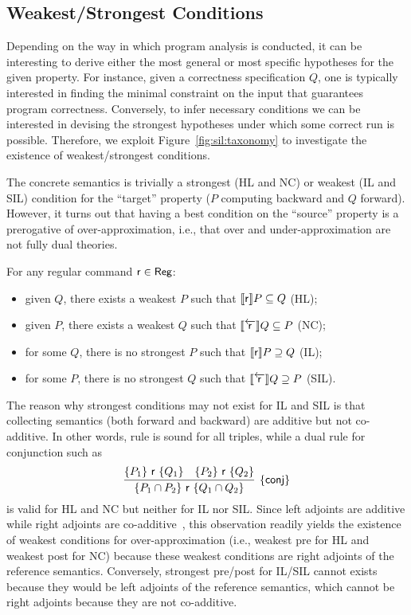\subsection{Weakest/Strongest Conditions}
Depending on the way in which program analysis is conducted, it can be interesting to derive either the most general or most specific hypotheses for the given property.
For instance, given a correctness specification $Q$, one is typically interested in finding the minimal constraint on the input that guarantees program correctness.
Conversely, to infer necessary conditions we can be interested in devising the strongest hypotheses under which some correct run is possible.
Therefore, we exploit Figure~\ref{fig:sil:taxonomy} to investigate the existence of weakest/strongest conditions.

The concrete semantics is trivially a strongest (HL and NC) or weakest (IL and SIL) condition for the ``target'' property ($P$ computing backward and $Q$ forward).
However, it turns out that having a best condition on the ``source'' property is a prerogative of over-approximation, i.e., that over and under-approximation are not fully dual theories.

\begin{prop}\label{prop:sil:best-condition-source}
	For any regular command $\mathsf{r}\in\mathsf{Reg}$:
	\begin{itemize}
		\item given $Q$, there exists a weakest $P$ such that $\llbracket\mathsf{r}\rrbracket P \subseteq Q$ (HL);
		\item given $P$, there exists a weakest $Q$ such that $\llbracket\overleftarrow{\mathsf{r}}\rrbracket Q \subseteq P$ (NC);
		\item for some $Q$, there is no strongest $P$ such that $\llbracket\mathsf{r}\rrbracket P \supseteq Q$ (IL);
		\item for some $P$, there is no strongest $Q$ such that $\llbracket\overleftarrow{\mathsf{r}}\rrbracket Q \supseteq P$ (SIL).
	\end{itemize}
\end{prop}

The reason why strongest conditions may not exist for IL and SIL is that collecting semantics (both forward and backward) are additive but not co-additive. In other words, rule  is sound for all triples, while a dual rule for conjunction such as
\[
\infer[\hlrule{conj}]
{\hltriple{P_1 \cap P_2}{\regr}{Q_1 \cap Q_2}}
{\hltriple{P_1}{\regr}{Q_1} & \hltriple{P_2}{\regr}{Q_2} }
\]
is valid for HL and NC but neither for IL nor SIL.
Since left adjoints are additive while right adjoints are co-additive~\cite{DP02}, this observation readily yields the existence of weakest conditions for over-approximation (i.e., weakest pre for HL and weakest post for NC) because these weakest conditions are right adjoints of the reference semantics. Conversely, strongest pre/post for IL/SIL cannot exists because they would be left adjoints of the reference semantics, which cannot be right adjoints because they are not co-additive.

